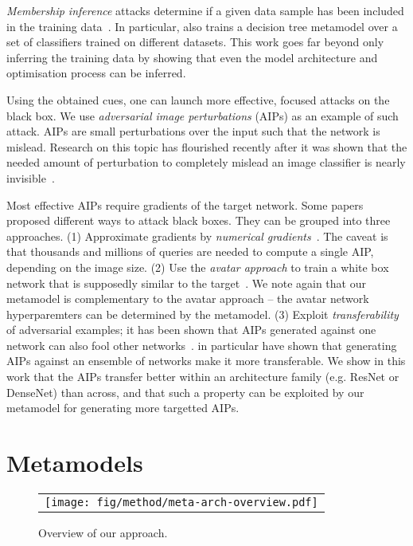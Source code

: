 \documentclass{article} %
\begin{document}
\emph{Membership inference} attacks determine if a given data sample has been included in the training data~\citep{Ateniese15IJSN,shokri2017sp}. In particular, \citet{Ateniese15IJSN} also trains a decision tree metamodel over a set of classifiers trained on different datasets. This work goes far beyond only inferring the training data by showing that even the model architecture and optimisation process can be inferred. 

Using the obtained cues, one can launch more effective, focused attacks on the black box. We use \emph{adversarial image perturbations} (AIPs) as an example of such attack. AIPs are small perturbations over the input such that the network is mislead. Research on this topic has flourished recently after it was shown that the needed amount of perturbation to completely mislead an image classifier is nearly invisible~\citep{szegedy2014iclr,goodfellow2015iclr,moosavi2016universal}. 

Most effective AIPs require gradients of the target network. Some papers proposed different ways to attack black boxes. They can be grouped into three approaches. (1) Approximate gradients by \emph{numerical gradients}~\citep{narodytska17cvprw,chen17zoo}. The caveat is that thousands and millions of queries are needed to compute a single AIP, depending on the image size. (2) Use the \emph{avatar approach} to train a white box network that is supposedly similar to the target~\citep{papernot16bb,papernot16fromphenomena,hayes17bb}. We note again that our metamodel is complementary to the avatar approach -- the avatar network hyperparemters can be determined by the metamodel. (3) Exploit \emph{transferability} of adversarial examples; it has been shown that AIPs generated against one network can also fool other networks~\citep{moosavi2016universal,liu17iclrblackbox}. \citet{liu17iclrblackbox} in particular have shown that generating AIPs against an ensemble of networks make it more transferable. We show in this work that the AIPs transfer better within an architecture family (e.g. ResNet or DenseNet) than across, and that such a property can be exploited by our metamodel for generating more targetted AIPs.

\section{\label{sec:metamodels}Metamodels}

\begin{wrapfigure}{r}{0.5\columnwidth}
\begin{centering}
\vspace{-4em}
\begin{tabular}{ c }
\texttt{[image: fig/method/meta-arch-overview.pdf]}
\end{tabular}
\par\end{centering}
\caption{\label{fig:methods-overview}Overview of our approach.}
\vspace{-1em}
\end{wrapfigure}
\end{document}
